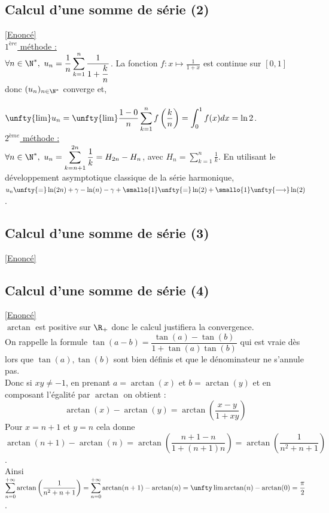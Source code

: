 \documentclass{book}
\begin{document}
	\subsection{Calcul d'une somme de série (2) }
	\label{Calcul d'une somme de série (2) corrigé}
	\textcolor{blue}{\hyperref[Calcul d'une somme de série (2)]{[Enoncé]}}\\
	\underline{$1^{ère}$ méthode :}\\
	$\forall n\in \N^*,\ u_n=\displaystyle\frac{1}{n}\sum\limits_{k=1}^n\frac{1}{1+\displaystyle\frac{k}{n}}$. La fonction $f:x\mapsto \displaystyle\frac{1}{1+x}$ est continue sur $[0,1]$ donc $(u_n)_{n\in \N^*}$ converge et,\\\\
	$\unfty{\lim}u_n=\unfty{\lim}\displaystyle\frac{
		1-0}{n}\sum\limits_{k=1}^nf\left(\frac{k}{n}\right)=\int_0^1f(x)dx=\ln 2$.\\
	\underline{$2^{ème}$ méthode :}\\
	$\forall n\in \N^*,\ u_n=\displaystyle\sum\limits_{k=n+1}^{2n}\frac{1}{k}=H_{2n}-H_n$, avec $H_n=\displaystyle\sum\limits_{k=1}^n\frac{1}{k}$.
	En utilisant le développement asymptotique classique de la série harmonique, $u_n\unfty{=}\ln(2n)+\gamma-\ln(n)-\gamma+\smallo{1}\unfty{=}\ln(2)+\smallo{1}\unfty{\longrightarrow}\ln(2)$.
	
	\subsection{Calcul d'une somme de série (3) }
	\label{Calcul d'une somme de série (3) corrigé}
	\textcolor{blue}{\hyperref[Calcul d'une somme de série (3)]{[Enoncé]}}\\
	
	\subsection{Calcul d'une somme de série (4) }
	\label{Calcul d'une somme de série (4) corrigé}
	\textcolor{blue}{\hyperref[Calcul d'une somme de série (4)]{[Enoncé]}}\\
	$\arctan$ est positive sur $\R_+$ donc le calcul justifiera la convergence.\\
	On rappelle la formule $\tan(a-b)=\dfrac{\tan(a)-\tan(b)}{1+\tan(a)\tan(b)}$ qui est vraie dès lors que $\tan(a),\tan(b)$ sont bien définis et que le dénominateur ne s'annule pas.\\
	Donc si $xy\ne -1$, en prenant $a=\arctan(x)$ et $b=\arctan(y)$ et en composant l'égalité par $\arctan$ on obtient :
	$$\arctan(x)-\arctan(y)=\arctan\left(\frac{x-y}{1+xy}\right)$$
	Pour $x=n+1$ et $y=n$ cela donne $\arctan(n+1)-\arctan(n)=\arctan\left(\dfrac{n+1-n}{1+(n+1)n}\right)=\arctan\left(\dfrac{1}{n^2+n+1}\right)$.\\
	Ainsi $\displaystyle\sum_{n=0}^{+\infty}\arctan\left(\frac{1}{n^2+n+1}\right)=\sum_{n=0}^{+\infty}\arctan(n+1)-\arctan(n)=\unfty\lim\arctan(n)-\arctan(0)=\frac{\pi}{2}$.
	
\end{document}
